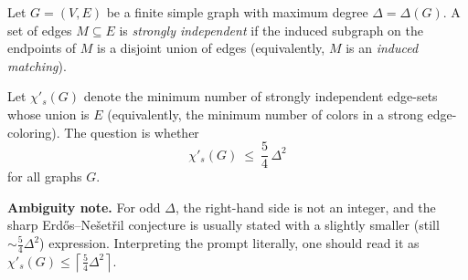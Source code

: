 Let $G=(V,E)$ be a finite simple graph with maximum degree $\Delta=\Delta(G)$.
A set of edges $M\subseteq E$ is \emph{strongly independent} if the induced subgraph on the
endpoints of $M$ is a disjoint union of edges (equivalently, $M$ is an \emph{induced matching}).

Let $\chi'_s(G)$ denote the minimum number of strongly independent edge-sets whose union is $E$
(equivalently, the minimum number of colors in a strong edge-coloring). The question is whether
\[
\chi'_s(G)\ \le\ \frac54\,\Delta^2
\]
for all graphs $G$.

\medskip
\noindent\textbf{Ambiguity note.} For odd $\Delta$, the right-hand side is not an integer, and the sharp
Erd\H{o}s--Ne\v{s}et\v{r}il conjecture is usually stated with a slightly smaller (still $\sim \frac54\Delta^2$)
expression. Interpreting the prompt literally, one should read it as
$\chi'_s(G)\le \left\lceil \frac54\Delta^2\right\rceil$.
